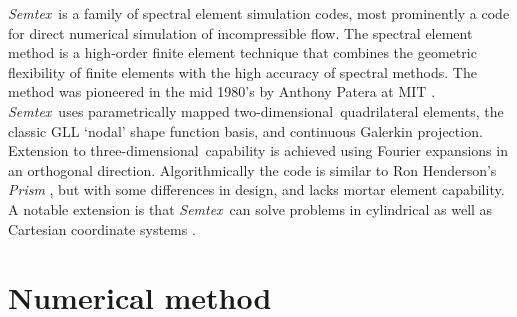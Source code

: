 \documentclass[11pt]{report}
\newcommand{\Semtex}{\emph{Semtex}} \newcommand{\Dog}{\emph{Dog}}
\newcommand\twod{two-di\-men\-sion\-al}
\newcommand\threed{three-di\-men\-sion\-al}
\begin{document}
\Semtex\ is a family of spectral element simulation codes, most
prominently a code for direct numerical simulation of incompressible
flow.  The spectral element method is a high-order finite element
technique that combines the geometric flexibility of finite elements
with the high accuracy of spectral methods.  The method was pioneered
in the mid 1980's by Anthony Patera at MIT
\citep{pat84,kp86}. \Semtex\ uses parametrically mapped
\twod\ quadrilateral elements, the classic GLL `nodal' shape function
basis, and continuous Galerkin projection. Extension to
\threed\ capability is achieved using Fourier expansions in an
orthogonal direction.  Algorithmically the code is similar to Ron
Henderson's \emph{Prism} \citep{hk95,kh98,hen99b}, but with some
differences in design, and lacks mortar element capability. A notable
extension is that \Semtex\ can solve problems in cylindrical as well
as Cartesian coordinate systems \citep{blsh04}.

\section{Numerical method}
\end{document}
